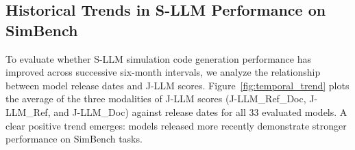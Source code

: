 \documentclass{ieeeaccess}
\begin{document}

\subsection{Historical Trends in S-LLM Performance on SimBench}

To evaluate whether S-LLM simulation code generation performance has improved across successive six-month intervals, we analyze the relationship between model release dates and J-LLM scores. Figure~\ref{fig:temporal_trend} plots the average of the three modalities of J-LLM scores (J-LLM\_Ref\_Doc, J-LLM\_Ref, and J-LLM\_Doc) against release dates for all 33 evaluated models. 
A clear positive trend emerges: models released more recently demonstrate stronger performance on SimBench tasks. 
\end{document}
